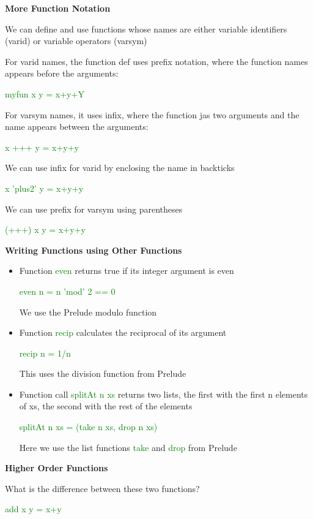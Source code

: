\documentclass{article}
\begin{document}
\textbf{More Function Notation}

We can define and use functions whose names are either variable identifiers (varid) or variable operators (varsym)

For varid names, the function def uses prefix notation, where the function names appears before the arguments:

\textcolor{green}{myfun  x  y = x+y+Y}

For varsym names, it uses infix, where the function jas two arguments and the name appears between the arguments:

\textcolor{green}{x  +++  y = x+y+y}

We can use infix for varid by enclosing the name in backticks

\textcolor{green}{x  'plus2'  y = x+y+y}

We can use prefix for varsym using parentheses

\textcolor{green}{(+++)  x  y = x+y+y}


\textbf{Writing Functions using Other Functions}

\begin{itemize}
\item Function \textcolor{green}{even} returns true if its integer argument is even

\textcolor{green}{even  n = n  'mod'  2 == 0}

We use the Prelude modulo function 

\item Function \textcolor{green}{recip} calculates the reciprocal of its argument

\textcolor{green}{recip  n = 1/n}

This uses the division function from Prelude

\item Function call \textcolor{green}{splitAt  n  xs} returns two lists, the first with the first n elements of xs, the second with the rest of the elements

\textcolor{green}{splitAt  n  xs = (take n xs, drop n xs)}

Here we use the list functions \textcolor{green}{take} and \textcolor{green}{drop} from Prelude
\end{itemize}


\textbf{Higher Order Functions}

What is the difference between these two functions?



\textcolor{green}{add  x  y = x+y}
\end{document}
